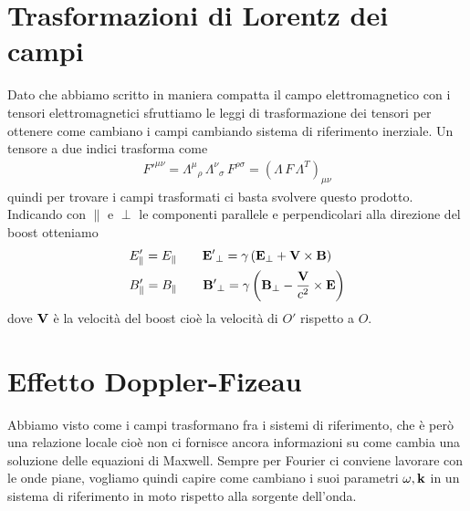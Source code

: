 \section{Trasformazioni di Lorentz dei campi}
Dato che abbiamo scritto in maniera compatta il campo elettromagnetico con i tensori elettromagnetici sfruttiamo le leggi di trasformazione dei tensori per 
ottenere come cambiano i campi cambiando sistema di riferimento inerziale. Un tensore a due indici trasforma come
\begin{align}
  F'^{\mu \nu} = \Lambda^\mu{}_\rho \, \Lambda^\nu{}_\sigma \, F^{\rho \sigma} = \left( \Lambda \, F \, \Lambda^T \right)_{\mu \nu}
\end{align}
quindi per trovare i campi trasformati ci basta svolvere questo prodotto. Indicando con $ \parallel $ e $ \perp $ le componenti parallele e 
perpendicolari alla direzione del boost otteniamo 
\begin{align}
  &{E'_\parallel = E_\parallel} \qquad { \mathbf{E'} _\perp = \gamma \left(  \mathbf{E} _\perp +  \mathbf{V}  \times  \mathbf{B}  \right)}
  \\
  &{B'_\parallel = B_\parallel} \qquad { \mathbf{B'} _\perp = \gamma \left(  \mathbf{B} _\perp - \frac{ \mathbf{V} }{c^2} \times  \mathbf{E}  \right)}
\end{align}
dove $ \mathbf{V} $ è la velocità del boost cioè la velocità di $ O' $ rispetto a $ O $.

\section{Effetto Doppler-Fizeau}
Abbiamo visto come i campi trasformano fra i sistemi di riferimento, che è però una relazione locale cioè non ci fornisce ancora informazioni su come 
cambia una soluzione delle equazioni di Maxwell. Sempre per Fourier ci conviene lavorare con le onde piane, vogliamo quindi capire come cambiano i 
suoi parametri $ \omega, \mathbf{k} $ in un sistema di riferimento in moto rispetto alla sorgente dell'onda.

